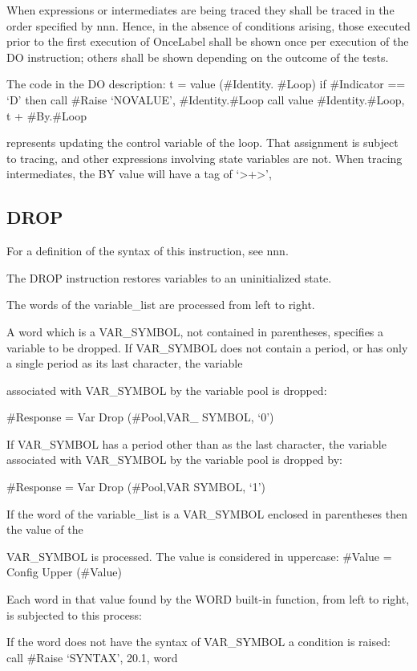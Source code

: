 When expressions or intermediates are being traced they shall be traced
in the order specified by nnn. Hence, in the absence of conditions
arising, those executed prior to the first execution of OnceLabel shall
be shown once per execution of the DO instruction; others shall be shown
depending on the outcome of the tests.

The code in the DO description: t = value (\#Identity. \#Loop) if
\#Indicator == `D' then call \#Raise `NOVALUE', \#Identity.\#Loop call
value \#Identity.\#Loop, t + \#By.\#Loop

represents updating the control variable of the loop. That assignment is
subject to tracing, and other expressions involving state variables are
not. When tracing intermediates, the BY value will have a tag of
`\textgreater+\textgreater{}',

\hypertarget{drop}{%
\subsection{DROP}\label{drop}}

For a definition of the syntax of this instruction, see nnn.

The DROP instruction restores variables to an uninitialized state.

The words of the variable\_list are processed from left to right.

A word which is a VAR\_SYMBOL, not contained in parentheses, specifies a
variable to be dropped. If VAR\_SYMBOL does not contain a period, or has
only a single period as its last character, the variable

associated with VAR\_SYMBOL by the variable pool is dropped:

\#Response = Var Drop (\#Pool,VAR\_ SYMBOL, `0')

If VAR\_SYMBOL has a period other than as the last character, the
variable associated with VAR\_SYMBOL by the variable pool is dropped by:

\#Response = Var Drop (\#Pool,VAR SYMBOL, `1')

If the word of the variable\_list is a VAR\_SYMBOL enclosed in
parentheses then the value of the

VAR\_SYMBOL is processed. The value is considered in uppercase: \#Value
= Config Upper (\#Value)

Each word in that value found by the WORD built-in function, from left
to right, is subjected to this process:

If the word does not have the syntax of VAR\_SYMBOL a condition is
raised: call \#Raise `SYNTAX', 20.1, word


